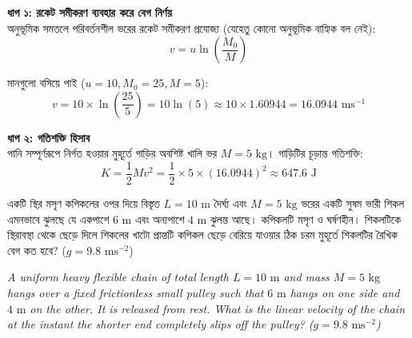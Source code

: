 \documentclass[12pt, a4paper]{article}
\begin{document}
{{%
\begin{tcolorbox}[solutionbox={সমাধান (Solution)}]
    \noindent
    \textbf{ধাপ ১: রকেট সমীকরণ ব্যবহার করে বেগ নির্ণয়} \\
    অনুভূমিক সমতলে পরিবর্তনশীল ভরের রকেট সমীকরণ প্রযোজ্য (যেহেতু কোনো অনুভূমিক বাহ্যিক বল নেই):
    \[ v = u \ln\left(\frac{M_0}{M}\right) \]
    
    মানগুলো বসিয়ে পাই ($u = 10, M_0 = 25, M = 5$):
    \[ v = 10 \times \ln\left(\frac{25}{5}\right) = 10 \ln(5) \approx 10 \times 1.60944 = 16.0944\text{ ms}^{-1} \]
    
    \vspace{0.5em}
    \noindent\textbf{ধাপ ২: গতিশক্তি হিসাব} \\
    পানি সম্পূর্ণরূপে নির্গত হওয়ার মুহূর্তে গাড়ির অবশিষ্ট খালি ভর $M = 5\text{ kg}$। গাড়িটির চূড়ান্ত গতিশক্তি:
    \[ K = \frac{1}{2} M v^2 = \frac{1}{2} \times 5 \times (16.0944)^2 \approx \mathbf{647.6}\text{ J} \]
\end{tcolorbox}
\newpage

\begin{tcolorbox}[questionbox={প্রশ্ন (Question) 42}]
    \noindent
    একটি স্থির মসৃণ কপিকলের ওপর দিয়ে বিস্তৃত $L = 10\text{ m}$ দৈর্ঘ্য এবং $M = 5\text{ kg}$ ভরের একটি সুষম ভারী শিকল এমনভাবে ঝুলছে যে একপাশে $6\text{ m}$ এবং অন্যপাশে $4\text{ m}$ ঝুলন্ত আছে। কপিকলটি মসৃণ ও ঘর্ষণহীন। শিকলটিকে স্থিরাবস্থা থেকে ছেড়ে দিলে শিকলের খাটো প্রান্তটি কপিকল ছেড়ে বেরিয়ে যাওয়ার ঠিক চরম মুহূর্তে শিকলটির রৈখিক বেগ কত হবে? ($g = 9.8\text{ ms}^{-2}$)
    
    \vspace{0.8em}
    \begin{english}
    \noindent\textit{\color{darkgray}
    A uniform heavy flexible chain of total length $L = 10\text{ m}$ and mass $M = 5\text{ kg}$ hangs over a fixed frictionless small pulley such that $6\text{ m}$ hangs on one side and $4\text{ m}$ on the other. It is released from rest. What is the linear velocity of the chain at the instant the shorter end completely slips off the pulley? ($g = 9.8\text{ ms}^{-2}$)
    }
    \end{english}
\end{tcolorbox}

\vspace{1em}
\begin{center}
\end{center}}}
\end{document}

